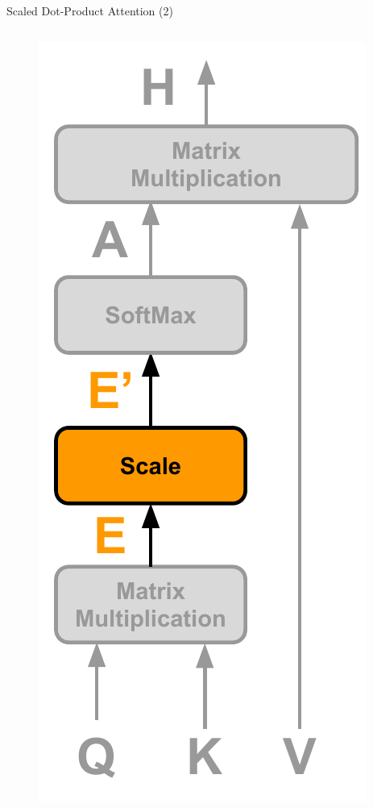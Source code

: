 \documentclass[10pt]{beamer}
\begin{document}
\begin{frame}[fragile]{Scaled Dot-Product Attention (2)}
    \begin{columns}
        \begin{figure}
            \centering
            \includegraphics[width=\textwidth]{figures/model/attention_step2.pdf}
        \end{figure}


\end{columns}
\end{frame}
\end{document}
